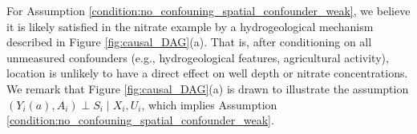 \documentclass[12pt]{article}
\begin{document}
For Assumption \ref{condition:no_confouning_spatial_confounder_weak}, we believe it is likely satisfied in the nitrate example by a hydrogeological mechanism described in Figure \ref{fig:causal_DAG}(a). That is, after conditioning on all unmeasured confounders (e.g., hydrogeological features, agricultural activity), location is unlikely to have a direct effect on well depth or nitrate concentrations. We remark that  Figure \ref{fig:causal_DAG}(a) is drawn to  illustrate the assumption $(Y_i(a), A_i) \perp S_i\mid X_i, U_i$, which implies Assumption \ref{condition:no_confouning_spatial_confounder_weak}. 

\end{document}
